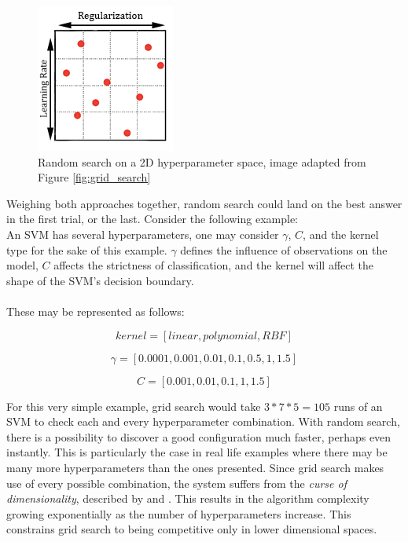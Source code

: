 \begin{figure}
	\centering
	\includegraphics[width=0.5\linewidth]{graphics/hyperparameters/random}
	\caption{Random search on a 2D hyperparameter space, image adapted from Figure \ref{fig:grid_search}}
	\label{fig:random_search}
\end{figure}


\noindent Weighing both approaches together, random search could land on the best answer in the first trial, or the last. Consider the following example:\\

An SVM has several hyperparameters, one may consider $\gamma$, $C$, and the kernel type for the sake of this example. $\gamma$ defines the influence of observations on the model, $C$ affects the strictness of classification, and the kernel will affect the shape of the SVM's decision boundary.\\\\

These may be represented as follows:

\[kernel = [linear, polynomial, RBF] \]

\[\gamma = [0.0001, 0.001, 0.01, 0.1 , 0.5, 1, 1.5]\]

\[C = [0.001, 0.01, 0.1, 1, 1.5] \]

For this very simple example, grid search would take $3*7*5 = 105$ runs of an SVM to check each and every hyperparameter combination. With random search, there is a possibility to discover a good configuration much faster, perhaps even instantly. This is particularly the case in real life examples where there may be many more hyperparameters than the ones presented.  Since grid search makes use of every possible combination, the system suffers from the \textit{curse of dimensionality}, described by \cite{Chen2009} and \cite{Bellman2015}. This results in the algorithm complexity growing exponentially as the number of hyperparameters increase. This constrains grid search to being competitive only in lower dimensional spaces.\\

